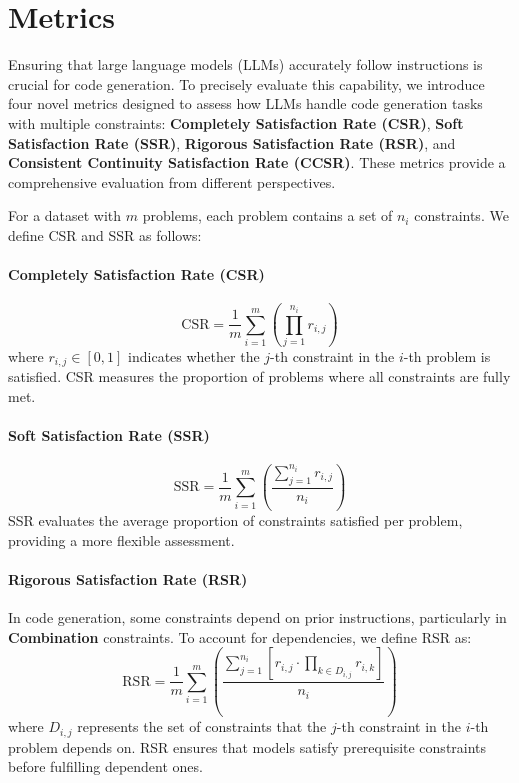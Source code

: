 \section{Metrics}

Ensuring that large language models (LLMs) accurately follow instructions is crucial for code generation. To precisely evaluate this capability, we introduce four novel metrics designed to assess how LLMs handle code generation tasks with multiple constraints: \textbf{Completely Satisfaction Rate (CSR)}, \textbf{Soft Satisfaction Rate (SSR)}, \textbf{Rigorous Satisfaction Rate (RSR)}, and \textbf{Consistent Continuity Satisfaction Rate (CCSR)}. These metrics provide a comprehensive evaluation from different perspectives.

For a dataset with $m$ problems, each problem contains a set of $n_i$ constraints. We define CSR and SSR as follows:

\paragraph{Completely Satisfaction Rate (CSR)}
\begin{equation}
\text{CSR} = \frac{1}{m} \sum_{i=1}^{m} \left( \prod_{j=1}^{n_i} r_{i,j} \right)
\end{equation}
where $r_{i,j} \in [0,1]$ indicates whether the $j$-th constraint in the $i$-th problem is satisfied. CSR measures the proportion of problems where all constraints are fully met.

\paragraph{Soft Satisfaction Rate (SSR)}
\begin{equation}
\text{SSR} = \frac{1}{m} \sum_{i=1}^{m} \left( \frac{\sum_{j=1}^{n_i} r_{i,j}}{n_i} \right)
\end{equation}
SSR evaluates the average proportion of constraints satisfied per problem, providing a more flexible assessment.

\paragraph{Rigorous Satisfaction Rate (RSR)}
In code generation, some constraints depend on prior instructions, particularly in \textbf{Combination} constraints. To account for dependencies, we define RSR as:
\begin{equation}
\text{RSR} = \frac{1}{m} \sum_{i=1}^{m} \left( \frac{\sum_{j=1}^{n_i} \left[ r_{i,j} \cdot \prod_{k \in D_{i,j}} r_{i,k} \right]}{n_i} \right)
\end{equation}
where $D_{i,j}$ represents the set of constraints that the $j$-th constraint in the $i$-th problem depends on. RSR ensures that models satisfy prerequisite constraints before fulfilling dependent ones.

